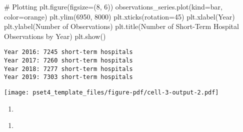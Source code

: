 \documentclass[
  letterpaper,
  DIV=11,
  numbers=noendperiod]{scrartcl}
\newenvironment{Shaded}{\begin{snugshade}}{\end{snugshade}}
\newcommand{\CommentTok}[1]{\textcolor[rgb]{0.37,0.37,0.37}{#1}}
\newcommand{\DecValTok}[1]{\textcolor[rgb]{0.68,0.00,0.00}{#1}}
\newcommand{\NormalTok}[1]{\textcolor[rgb]{0.00,0.23,0.31}{#1}}
\newcommand{\OperatorTok}[1]{\textcolor[rgb]{0.37,0.37,0.37}{#1}}
\newcommand{\StringTok}[1]{\textcolor[rgb]{0.13,0.47,0.30}{#1}}
\providecommand{\tightlist}{%
  \setlength{\itemsep}{0pt}\setlength{\parskip}{0pt}}\usepackage{longtable,booktabs,array}
\begin{document}
\begin{Shaded}
\begin{Highlighting}[]
\CommentTok{\# Plotting}
\NormalTok{plt.figure(figsize}\OperatorTok{=}\NormalTok{(}\DecValTok{8}\NormalTok{, }\DecValTok{6}\NormalTok{))}
\NormalTok{observations\_series.plot(kind}\OperatorTok{=}\StringTok{\textquotesingle{}bar\textquotesingle{}}\NormalTok{, color}\OperatorTok{=}\StringTok{\textquotesingle{}orange\textquotesingle{}}\NormalTok{)}
\NormalTok{plt.ylim(}\DecValTok{6950}\NormalTok{, }\DecValTok{8000}\NormalTok{)  }
\NormalTok{plt.xticks(rotation}\OperatorTok{=}\DecValTok{45}\NormalTok{)}
\NormalTok{plt.xlabel(}\StringTok{\textquotesingle{}Year\textquotesingle{}}\NormalTok{)}
\NormalTok{plt.ylabel(}\StringTok{\textquotesingle{}Number of Observations\textquotesingle{}}\NormalTok{)}
\NormalTok{plt.title(}\StringTok{\textquotesingle{}Number of Short{-}Term Hospital Observations by Year\textquotesingle{}}\NormalTok{)}
\NormalTok{plt.show()}
\end{Highlighting}
\end{Shaded}

\begin{verbatim}
Year 2016: 7245 short-term hospitals
Year 2017: 7260 short-term hospitals
Year 2018: 7277 short-term hospitals
Year 2019: 7303 short-term hospitals
\end{verbatim}

\texttt{[image: pset4\_template\_files/figure-pdf/cell-3-output-2.pdf]}

\begin{enumerate}
\def\labelenumi{\arabic{enumi}.}
\setcounter{enumi}{3}
\tightlist
\item
\end{enumerate}

\begin{enumerate}
\def\labelenumi{\alph{enumi}.}
\tightlist
\item
\end{enumerate}
\end{document}
